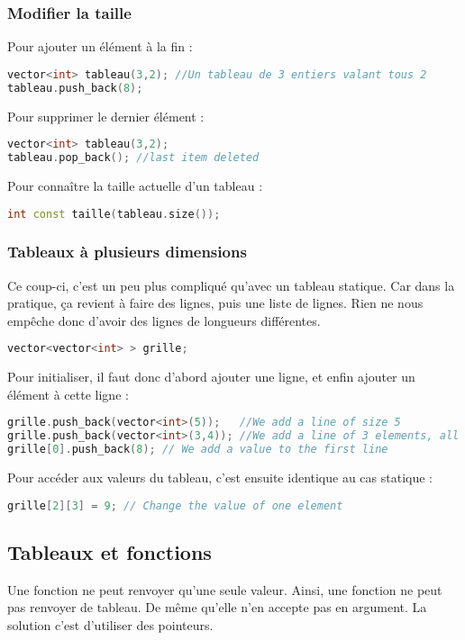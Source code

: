 \documentclass[a4paper,twoside]{article}
\begin{document}
\subsubsection{Modifier la taille}
Pour ajouter un élément à la fin :
\begin{lstlisting}[language=C++]
vector<int> tableau(3,2); //Un tableau de 3 entiers valant tous 2
tableau.push_back(8);
\end{lstlisting}

Pour supprimer le dernier élément :
\begin{lstlisting}[language=C++]
vector<int> tableau(3,2); 
tableau.pop_back(); //last item deleted
\end{lstlisting}

Pour connaître la taille actuelle d'un tableau :
\begin{lstlisting}[language=C++]
int const taille(tableau.size());
\end{lstlisting}

\subsubsection{Tableaux à plusieurs dimensions}
Ce coup-ci, c'est un peu plus compliqué qu'avec un tableau statique. Car dans la pratique, ça revient à faire des lignes, puis 
une liste de lignes. Rien ne nous empêche donc d'avoir des lignes de longueurs différentes. 

\begin{lstlisting}[language=C++]
vector<vector<int> > grille;
\end{lstlisting}

Pour initialiser, il faut donc d'abord ajouter une ligne, et enfin ajouter un élément à 
cette ligne :
\begin{lstlisting}[language=C++]
grille.push_back(vector<int>(5));   //We add a line of size 5
grille.push_back(vector<int>(3,4)); //We add a line of 3 elements, all equal to 4.
grille[0].push_back(8); // We add a value to the first line
\end{lstlisting}

Pour accéder aux valeurs du tableau, c'est ensuite identique au cas statique :
\begin{lstlisting}[language=C++]
grille[2][3] = 9; // Change the value of one element
\end{lstlisting}

\subsection{Tableaux et fonctions}\label{sec:tableaux_fonctions}
Une fonction ne peut renvoyer qu'une seule valeur. Ainsi, une fonction ne peut pas renvoyer de tableau. De même qu'elle n'en 
accepte pas en argument. La solution c'est d'utiliser des pointeurs. 
\end{document}
